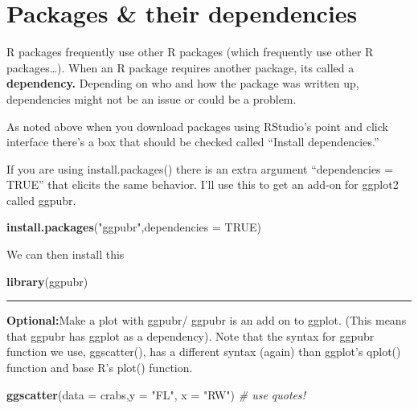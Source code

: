 \documentclass[]{book}
\newenvironment{Shaded}{\begin{snugshade}}{\end{snugshade}}
\newcommand{\KeywordTok}[1]{\textcolor[rgb]{0.13,0.29,0.53}{\textbf{#1}}}
\newcommand{\DataTypeTok}[1]{\textcolor[rgb]{0.13,0.29,0.53}{#1}}
\newcommand{\StringTok}[1]{\textcolor[rgb]{0.31,0.60,0.02}{#1}}
\newcommand{\CommentTok}[1]{\textcolor[rgb]{0.56,0.35,0.01}{\textit{#1}}}
\newcommand{\OtherTok}[1]{\textcolor[rgb]{0.56,0.35,0.01}{#1}}
\newcommand{\NormalTok}[1]{#1}
\theoremstyle{definition}
\theoremstyle{definition}
\theoremstyle{definition}
\theoremstyle{remark}
\begin{document}
\section{\texorpdfstring{\protect\hyperlink{section-3}{} Packages \&
their
dependencies}{ Packages \& their dependencies}}\label{packages-their-dependencies}

R packages frequently use other R packages (which frequently use other R
packages\ldots{}). When an R package requires another package, its
called a \textbf{dependency.} Depending on who and how the package was
written up, dependencies might not be an issue or could be a problem.

As noted above when you download packages using RStudio's point and
click interface there's a box that should be checked called ``Install
dependencies.''

If you are using install.packages() there is an extra argument
``dependencies = TRUE'' that elicits the same behavior. I'll use this to
get an add-on for ggplot2 called ggpubr.

\begin{Shaded}
\begin{Highlighting}[]
\KeywordTok{install.packages}\NormalTok{(}\StringTok{"ggpubr"}\NormalTok{,}\DataTypeTok{dependencies =} \OtherTok{TRUE}\NormalTok{)}
\end{Highlighting}
\end{Shaded}

We can then install this

\begin{Shaded}
\begin{Highlighting}[]
\KeywordTok{library}\NormalTok{(ggpubr)}
\end{Highlighting}
\end{Shaded}

\begin{center}\rule{0.5\linewidth}{\linethickness}\end{center}

\textbf{Optional:}Make a plot with ggpubr/ ggpubr is an add on to
ggplot. (This means that ggpubr has ggplot as a dependency). Note that
the syntax for ggpubr function we use, ggscatter(), has a different
syntax (again) than ggplot's qplot() function and base R's plot()
function.

\begin{Shaded}
\begin{Highlighting}[]
\KeywordTok{ggscatter}\NormalTok{(}\DataTypeTok{data =}\NormalTok{ crabs,}\DataTypeTok{y =} \StringTok{"FL"}\NormalTok{, }\DataTypeTok{x =} \StringTok{"RW"}\NormalTok{) }\CommentTok{# use quotes!}
\end{Highlighting}
\end{Shaded}
\end{document}
